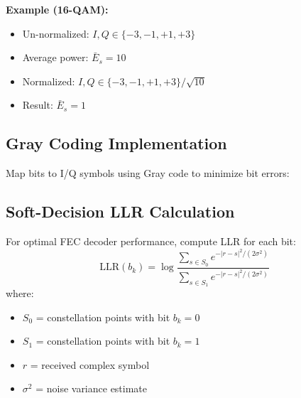 \textbf{Example (16-QAM):}
\begin{itemize}
\item Un-normalized: $I, Q \in \{-3, -1, +1, +3\}$
\item Average power: $\bar{E}_s = 10$
\item Normalized: $I, Q \in \{-3, -1, +1, +3\}/\sqrt{10}$
\item Result: $\bar{E}_s = 1$
\end{itemize}

\subsection{Gray Coding Implementation}

Map bits to I/Q symbols using Gray code to minimize bit errors:

\begin{Shaded}
\begin{Highlighting}[]
\OperatorTok{=}\NormalTok{ [}\NormalTok{, }\NormalTok{, }\NormalTok{, }\NormalTok{]  }
\OperatorTok{=}\NormalTok{ bits[}\NormalTok{:}\NormalTok{]}
\OperatorTok{=}\NormalTok{ bits[}\NormalTok{:}\NormalTok{]}
    
\OperatorTok{=}
\OperatorTok{=}
    
\OperatorTok{=} \OperatorTok{*}\OperatorTok{{-}}   
\OperatorTok{=} \OperatorTok{*}\OperatorTok{{-}} 
    
    \OperatorTok{+} \OperatorTok{*}
\end{Highlighting}
\end{Shaded}


\subsection{Soft-Decision LLR Calculation}

For optimal FEC decoder performance, compute LLR for each bit:
\begin{equation}
\text{LLR}(b_k) = \log\frac{\sum_{s \in S_0} e^{-|r-s|^2/(2\sigma^2)}}{\sum_{s \in S_1} e^{-|r-s|^2/(2\sigma^2)}}
\label{eq:llr-calculation}
\end{equation}
where:
\begin{itemize}
\item $S_0$ = constellation points with bit $b_k = 0$
\item $S_1$ = constellation points with bit $b_k = 1$
\item $r$ = received complex symbol
\item $\sigma^2$ = noise variance estimate
\end{itemize}

